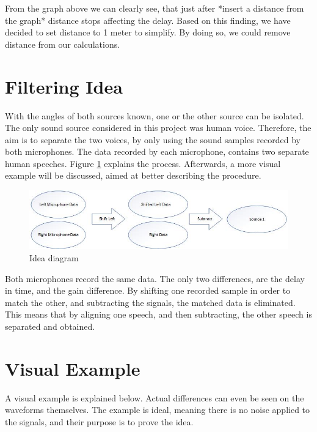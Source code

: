 From the graph above we can clearly see, that just after *insert a distance from 
the graph* distance stops affecting the delay. Based on this finding, we have 
decided to set distance to 1 meter to simplify. By doing so, we could remove 
distance from our calculations.













\newpage
\section{Filtering Idea}
With the angles of both sources known, one or the other source can be isolated. The only 
sound source considered in this project was human voice. Therefore, the aim is to 
separate the two voices, by only using the sound samples recorded by both microphones. 
The data recorded by each microphone, contains two separate human speeches.
Figure \ref{fig:IdeaDiagram} explains the process. Afterwards, a more visual example will be discussed,
aimed at better describing the procedure. 

\begin{figure}[htp]
	\centering
	\includegraphics[width=1\textwidth]{Illustrations/IdeaDiagram.jpg}
	\caption{Idea diagram}
	\label{fig:IdeaDiagram}
\end{figure}

Both microphones record the same data. The only two differences, are the delay in time,
and the gain difference. By shifting one recorded sample in order to match the other,
and subtracting the signals, the matched data is eliminated. This means that by aligning 
one speech, and then subtracting, the other speech is separated and obtained.

\newpage

\section{Visual Example}
A visual example is explained below. Actual differences can even be seen on the waveforms themselves.
The example is ideal, meaning there is no noise applied to the signals, and their purpose is to 
prove the idea.

